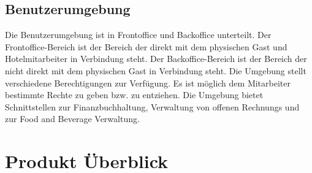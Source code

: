 \documentclass[10pt,a4paper,titlepage]{article}
\begin{document}
\subsection{Benutzerumgebung}
Die Benutzerumgebung ist in \Gls{Frontoffice} und \Gls{Backoffice} unterteilt. Der \Gls{Frontoffice}-Bereich ist der Bereich der direkt mit dem physischen \Gls{Gast} und Hotelmitarbeiter in Verbindung steht. Der \Gls{Backoffice}-Bereich ist der Bereich der nicht direkt mit dem physischen \Gls{Gast} in Verbindung steht. Die Umgebung stellt verschiedene Berechtigungen zur Verfügung. Es ist möglich dem \Gls{Mitarbeiter} bestimmte Rechte zu geben bzw. zu entziehen. Die Umgebung bietet Schnittstellen zur Finanzbuchhaltung, Verwaltung von offenen \Glspl{Rechnung} und zur Food and Beverage Verwaltung.

\newpage

\section{Produkt Überblick}
\end{document}
